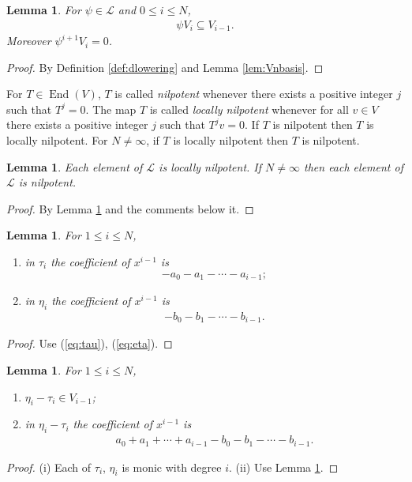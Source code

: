 \documentclass[pdftex]{sigma}
\numberwithin{equation}{section}
\newtheorem{Lemma}[Theorem]{Lemma}
\begin{document}
\begin{Lemma}\label{lem:psiVn}
For $\psi \in \mathcal L$ and $0 \leq i \leq N$,
\begin{gather*}
\psi V_i \subseteq V_{i-1}.
\end{gather*}
Moreover $\psi^{i+1}V_i =0$.
\end{Lemma}
\begin{proof} By Definition
\ref{def:dlowering}
and Lemma \ref{lem:Vnbasis}.
\end{proof}

For $T \in \operatorname{End}(V)$,
$T$ is called {\it nilpotent} whenever there exists a positive
integer $j$ such that $T^j=0$.
The map $T$ is called {\it locally nilpotent} whenever
for all $v \in V$ there exists a positive integer $j$ such
that $T^jv=0$. If $T$ is nilpotent then $T$ is locally nilpotent.
For $N\not=\infty$, if $T$ is locally nilpotent then $T$ is nilpotent.

\begin{Lemma}\label{lem:nilp}
Each element of $\mathcal L$ is locally nilpotent.
If $N\not=\infty$ then each element of $\mathcal L$ is nilpotent.
\end{Lemma}
\begin{proof} By Lemma \ref{lem:psiVn} and the comments below it.
\end{proof}

\begin{Lemma}\label{lem:lterm}
For $1 \leq i \leq N$,
\begin{enumerate}\itemsep=0pt
\item[$(i)$] in $\tau_i$ the coefficient of $x^{i-1}$ is
\begin{gather*}
- a_0 - a_1 - \cdots - a_{i-1};
\end{gather*}
\item[$(ii)$] in $\eta_i$ the coefficient of $x^{i-1}$ is
\begin{gather*}
- b_0 - b_1 - \cdots - b_{i-1}.
\end{gather*}
\end{enumerate}
\end{Lemma}
\begin{proof} Use (\ref{eq:tau}), (\ref{eq:eta}).
\end{proof}

\begin{Lemma}\label{lem:etaMtau}
For $1 \leq i \leq N$,
\begin{enumerate}\itemsep=0pt
\item[$(i)$] $\eta_i - \tau_i \in V_{i-1}$;
\item[$(ii)$] in $\eta_i - \tau_i$ the coefficient of
$x^{i-1} $ is
\begin{gather*}
a_0 + a_1 + \cdots + a_{i-1} -
b_0 - b_1 - \cdots - b_{i-1}.
\end{gather*}
\end{enumerate}
\end{Lemma}
\begin{proof} (i) Each of $\tau_i$, $\eta_i$ is monic with degree $i$.
(ii) Use Lemma \ref{lem:lterm}.
\end{proof}
\end{document}
